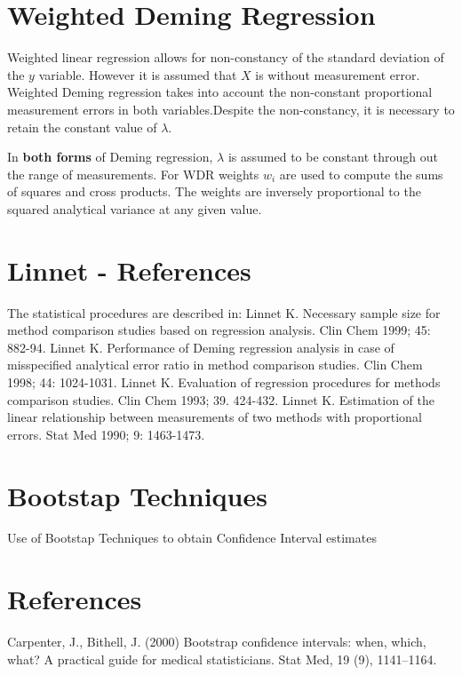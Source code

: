 \documentclass[12pt, a4paper]{report}
\theoremstyle{plain}
\theoremstyle{definition}
\theoremstyle{remark}
\begin{document}
\section{Weighted Deming Regression}
Weighted linear regression allows for non-constancy of the standard deviation of the $y$ variable. However it is assumed that $X$ is without measurement error. Weighted Deming regression takes into account the non-constant proportional measurement errors in both variables.Despite the non-constancy, it is necessary to retain the constant value of $\lambda$.

In \textbf{both forms} of Deming regression, $\lambda$ is assumed to be constant through out the range of measurements. For WDR weights $w_{i}$ are used to compute the sums of squares and cross products. The weights are inversely proportional to the squared analytical variance at any given value.




\section{Linnet - References}
The statistical procedures are described in:
Linnet K. Necessary sample size for method comparison studies based on regression analysis. Clin Chem 1999; 45: 882-94.
Linnet K. Performance of Deming regression analysis in case of misspecified analytical error ratio in method comparison studies. Clin Chem 1998; 44: 1024-1031.
Linnet K. Evaluation of regression procedures for methods comparison studies. Clin Chem 1993; 39. 424-432.
Linnet K. Estimation of the linear relationship between measurements of two methods with proportional errors. Stat Med 1990; 9: 1463-1473.


\section{Bootstap Techniques}
Use of Bootstap Techniques to obtain Confidence Interval estimates

\section{References}
Carpenter, J., Bithell, J. (2000) Bootstrap conﬁdence intervals: when, which, what? A practical
guide for medical statisticians. Stat Med, 19 (9), 1141–1164.

\end{document}
